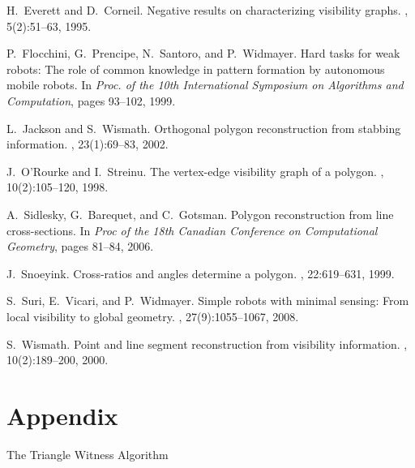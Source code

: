 \documentclass[11pt]{article}
\begin{document}
\begin{thebibliography}{10}
H.~Everett and D.~Corneil.
\newblock Negative results on characterizing visibility graphs.
, 5(2):51--63,
  1995.

P.~Flocchini, G.~Prencipe, N.~Santoro, and P.~Widmayer.
\newblock Hard tasks for weak robots: {The} role of common knowledge in pattern
  formation by autonomous mobile robots.
\newblock In {\em Proc. of the 10th International Symposium on Algorithms and
  Computation}, pages 93--102, 1999.

L.~Jackson and S.~Wismath.
\newblock Orthogonal polygon reconstruction from stabbing information.
, 23(1):69--83,
  2002.

J.~O'Rourke and I.~Streinu.
\newblock The vertex-edge visibility graph of a polygon.
,
  10(2):105--120, 1998.

A.~Sidlesky, G.~Barequet, and C.~Gotsman.
\newblock Polygon reconstruction from line cross-sections.
\newblock In {\em Proc of the 18th Canadian Conference on Computational
  Geometry}, pages 81--84, 2006.

J.~Snoeyink.
\newblock Cross-ratios and angles determine a polygon.
, 22:619--631, 1999.

S.~Suri, E.~Vicari, and P.~Widmayer.
\newblock Simple robots with minimal sensing: {From} local visibility to global
  geometry.
, 27(9):1055--1067,
  2008.

S.~Wismath.
\newblock Point and line segment reconstruction from visibility information.
, 10(2):189--200, 2000.

\end{thebibliography}



\newpage
\normalsize
\appendix
\section*{Appendix}

\begin{algorithm}
\caption{The Triangle Witness Algorithm \cite{ref:DisserRe10}}
\label{algo:10}
\BlankLine
{}
\; 
\;
\;
\For{ \KwTo }{
\;
\;
\;
}
\end{algorithm}
\end{document}
